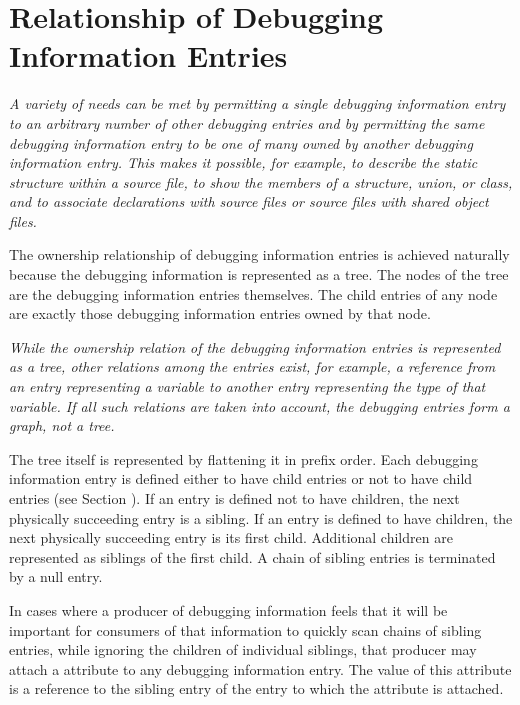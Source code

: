 \section{Relationship of Debugging Information Entries}
\label{chap:relationshipofdebugginginformationentries}
\textit{%
A variety of needs can be met by permitting a single
debugging information entry to  an arbitrary number
of other debugging entries and by permitting the same debugging
information entry to be one of many owned by another debugging
information entry. 
This makes it possible, for example, to
describe the static  structure 
within a source file,
to show the members of a structure, union, or class, and to
associate declarations with source files or source files
with shared object files.  
}

The ownership relationship 
of debugging
information entries is achieved naturally because the debugging
information is represented as a tree. The nodes of the tree
are the debugging information entries themselves. 
The child entries of any node are exactly those debugging information
entries owned by that node.  

\textit{%
While the ownership relation
of the debugging information entries is represented as a
tree, other relations among the entries exist, for example,
a reference from an entry representing a variable to another
entry representing the type of that variable. 
If all such
relations are taken into account, the debugging entries
form a graph, not a tree.  
}

The tree itself is represented
by flattening it in prefix order. 
Each debugging information
entry is defined either to have child entries or not to have
child entries (see Section ). 
If an entry is defined not
to have children, the next physically succeeding entry is a
sibling. 
If an entry is defined to have children, the next
physically succeeding entry is its first child. 
Additional
children are represented as siblings of the first child. 
A chain of sibling entries is terminated by a null entry.

In cases where a producer of debugging information feels that
it\hypertarget{chap:DWATsiblingdebugginginformationentryrelationship}{}
will be important for consumers of that information to
quickly scan chains of sibling entries, while ignoring the
children of individual siblings, that producer may attach a
\DWATsiblingDEFN{} attribute 
to any debugging information entry. 
The value of this attribute is a reference to the sibling entry
of the entry to which the attribute is attached.

